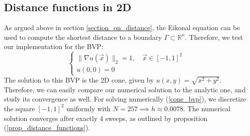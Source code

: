 \documentclass[11pt]{article}
\theoremstyle{definition}
\theoremstyle{remark}
\newcommand{\R}{\mathbb{R}}
\begin{document}
\subsection{Distance functions in 2D}
As argued above in section \ref{section_on_distance}, the Eikonal equation can be used to compute the shortest distance to a boundary $\Gamma \subset \R^n$. Therefore, we test our implementation for the BVP:
\begin{equation}
\label{cone_bvp}
    \begin{cases}
        \|\nabla u(\vec{x})\|_2=1 , \quad\vec{x} \in[-1,1]^2\\
        u(0,0)=0
    \end{cases}
\end{equation}
The solution to this BVP is the 2D cone, given by $u(x,y)=\sqrt{x^2+y^2}$. Therefore, we can easily compare our numerical solution to the analytic one, and study its convergence as well.
For solving numerically (\ref{cone_bvp}), we discretize the square $[-1,1]^2$ uniformly with $N=257 \implies h \approx 0.0078$. The numerical solution converges after exactly 4 sweeps, as outlined by proposition (\ref{prop_distance_functions}). \\
\end{document}

